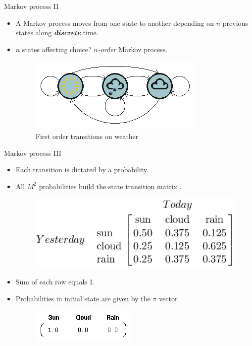 \documentclass[xcolor=x11names,compress]{beamer}
\renewcommand{\(}{\begin{columns}}
\renewcommand{\)}{\end{columns}}
\newcommand{\<}[1]{\begin{column}{#1}}
\renewcommand{\>}{\end{column}}
\begin{document}
\begin{frame}{Markov process II}
\begin{itemize}
\item A Markov process moves from one state to another depending on $n$ previous states along \emph{\textbf{discrete}} time.
\item $n$ states affecting choice? \emph{$n$-order} Markov process.
\begin{figure}[h]
	\centering
	\includegraphics[scale=0.5]{../report/resources/images/weather-example}
	\caption{First order transitions on weather}
	\label{fig:transiciones-clima}
\end{figure}
\end{itemize}
\end{frame}

\begin{frame}{Markov process III}
\begin{itemize}
\item Each transition is dictated by a probability.
\item All $M^2$ probabilities build the state transition matrix .
\begin{figure}[h]
	\centering
	\includegraphics[scale=0.5]{../report/resources/images/weather-matrix}
	\label{fig:matriz-transicion-clima}
\end{figure}
\item Sum of each row equals 1.
\item Probabilities in initial state are given by the $\pi$ vector
\begin{figure}[tb]
	\centering
	\includegraphics[scale=0.5]{../report/resources/images/pi-vector}
	\label{fig:vector-pi}
\end{figure}
\end{itemize}
\end{frame}
\end{document}
